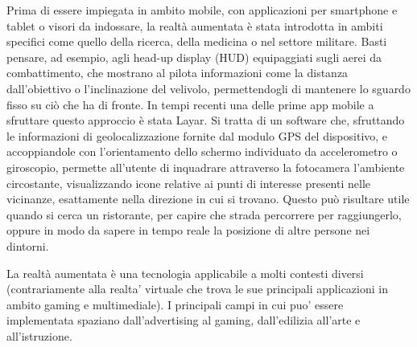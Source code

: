Prima di essere impiegata in ambito mobile, con applicazioni per smartphone e tablet o visori da indossare, la realtà aumentata è stata introdotta in ambiti specifici come quello della ricerca, della medicina o nel settore militare. Basti pensare, ad esempio, agli head-up display (HUD) equipaggiati sugli aerei da combattimento, che mostrano al pilota informazioni come la distanza dall’obiettivo o l’inclinazione del velivolo, permettendogli di mantenere lo sguardo fisso su ciò che ha di fronte.
In tempi recenti una delle prime app mobile a sfruttare questo approccio è stata Layar. Si tratta di un software che, sfruttando le informazioni di geolocalizzazione fornite dal modulo GPS del dispositivo, e accoppiandole con l’orientamento dello schermo individuato da accelerometro o giroscopio, permette all’utente di inquadrare attraverso la fotocamera l’ambiente circostante, visualizzando icone relative ai punti di interesse presenti nelle vicinanze, esattamente nella direzione in cui si trovano. Questo può risultare utile quando si cerca un ristorante, per capire che strada percorrere per raggiungerlo, oppure in modo da sapere in tempo reale la posizione di altre persone nei dintorni.

La realtà aumentata è una tecnologia applicabile a molti contesti diversi (contrariamente alla realta' virtuale che trova le sue principali applicazioni in ambito gaming e multimediale). I principali campi in cui puo' essere implementata spaziano dall'advertising al gaming, dall'edilizia all'arte e all'istruzione.